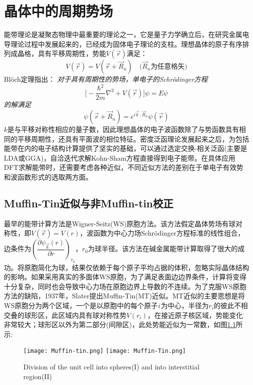 \chapter{晶体中的周期势场}
能带理论是凝聚态物理中最重要的理论之一，它是量子力学确立后，在研究金属电导理论过程中发展起来的，已经成为固体电子理论的支柱。理想晶体的原子有序排列成晶格，具有平移周期性，势能$V(\vec r)$满足：
\begin{equation}\label{eq:solid-2}
	V(\vec r)=V(\vec r+\vec R_n)\quad\mbox{($\vec R_n$为任意格矢)}
\end{equation}
\textrm{Bl\"och}定理指出：
{\it 对于具有周期性的势场，单电子的Schr\"odinger方程}
\begin{equation}\label{eq:solid-1}
  \biggl[-\dfrac{\hbar^2}{2m}\nabla^2+V(\vec r)\biggr]\psi=E\psi
\end{equation}
{\it 的解满足}
\begin{equation}
  \psi(\vec r+\vec R_n)=e^{i\vec k\cdot\vec R_n}\psi(\vec r)
  \label{eq:bloch}
\end{equation}
$k$是与平移对称性相应的量子数，因此理想晶体的电子波函数除了与势函数具有相同的平移周期性，还具有平面波的相位特征。密度泛函理论发展起来之后，为包括能带在内的电子结构计算提供了坚实的基础，可以通过选定交换-相关泛函(主要是LDA或GGA)，自洽迭代求解Kohn-Sham方程直接得到电子能带。在具体应用DFT求解能带时，还需要考虑各种近似，不同近似方法的差别在于单电子有效势和波函数形式的选取两方面。

\section{Muffin-Tin近似与非Muffin-tin校正}
最早的能带计算方法是Wigner-Seitz(WS)原胞方法\cite{PR43-804_1933}。该方法假定晶体势场有球对称性，即$V(\vec r)=V(r)$，波函数为中心力场Schr\"odinger方程标准的线性组合，边条件为$\left(\dfrac{\partial\psi_{\vec k}(r)}{\partial r}\right)_{r_0}$，$r_0$为球半径。该方法在碱金属能带计算取得了很大的成功。将原胞简化为球，结果仅依赖于每个原子平均占据的体积，忽略实际晶体结构的影响。如果采用真实的多面体WS原胞，为了满足表面边边界条件，计算将变得十分复杂，同时也会导致中心力场在原胞边界上导数的不连续。为了克服WS原胞方法的缺陷，1937年，Slater提出Muffin-Tin(MT)近似\cite{PR51-846_1937}。MT近似的主要思想是将WS原胞分为两个区域，一个是以原胞中的每个原子{\it i}\,为中心，半径为$r_i$的彼此不相交叠的球形区，此区域内具有球对称性势$V(r_i)$，在接近原子核区域，势能变化非常较大；球形区以外为第二部分(间隙区)，此处势能近似为一常数，如图\ref{Muffin_tin-1}所示:
\begin{figure}[h!]
\centering
\texttt{[image: Muffin-tin.png]}
\texttt{[image: Muffin-Tin.png]}
\caption{\small \textrm{Division of the unit cell into spheres(I) and into interstitial region(II)}}%
\label{Muffin_tin-1}
\end{figure}

